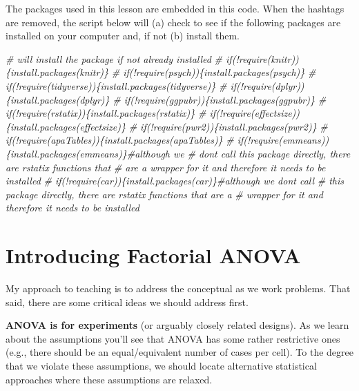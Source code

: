 \documentclass[
  11pt,
]{book}
\newenvironment{Shaded}{\begin{snugshade}}{\end{snugshade}}
\newcommand{\CommentTok}[1]{\textcolor[rgb]{0.37,0.37,0.37}{\textit{#1}}}
\begin{document}
The packages used in this lesson are embedded in this code. When the hashtags are removed, the script below will (a) check to see if the following packages are installed on your computer and, if not (b) install them.

\begin{Shaded}
\begin{Highlighting}[]
\CommentTok{\# will install the package if not already installed}
\CommentTok{\# if(!require(knitr))\{install.packages(\textquotesingle{}knitr\textquotesingle{})\}}
\CommentTok{\# if(!require(psych))\{install.packages(\textquotesingle{}psych\textquotesingle{})\}}
\CommentTok{\# if(!require(tidyverse))\{install.packages(\textquotesingle{}tidyverse\textquotesingle{})\}}
\CommentTok{\# if(!require(dplyr))\{install.packages(\textquotesingle{}dplyr\textquotesingle{})\}}
\CommentTok{\# if(!require(ggpubr))\{install.packages(\textquotesingle{}ggpubr\textquotesingle{})\}}
\CommentTok{\# if(!require(rstatix))\{install.packages(\textquotesingle{}rstatix\textquotesingle{})\}}
\CommentTok{\# if(!require(effectsize))\{install.packages(\textquotesingle{}effectsize\textquotesingle{})\}}
\CommentTok{\# if(!require(pwr2))\{install.packages(\textquotesingle{}pwr2\textquotesingle{})\}}
\CommentTok{\# if(!require(apaTables))\{install.packages(\textquotesingle{}apaTables\textquotesingle{})\}}
\CommentTok{\# if(!require(emmeans))\{install.packages(\textquotesingle{}emmeans\textquotesingle{})\}\#although we}
\CommentTok{\# don\textquotesingle{}t call this package directly, there are rstatix functions that}
\CommentTok{\# are a wrapper for it and therefore it needs to be installed}
\CommentTok{\# if(!require(car))\{install.packages(\textquotesingle{}car\textquotesingle{})\}\#although we don\textquotesingle{}t call}
\CommentTok{\# this package directly, there are rstatix functions that are a}
\CommentTok{\# wrapper for it and therefore it needs to be installed}
\end{Highlighting}
\end{Shaded}

\hypertarget{introducing-factorial-anova}{%
\section{Introducing Factorial ANOVA}\label{introducing-factorial-anova}}

My approach to teaching is to address the conceptual as we work problems. That said, there are some critical ideas we should address first.

\textbf{ANOVA is for experiments} (or arguably closely related designs). As we learn about the assumptions you'll see that ANOVA has some rather restrictive ones (e.g., there should be an equal/equivalent number of cases per cell). To the degree that we violate these assumptions, we should locate alternative statistical approaches where these assumptions are relaxed.
\end{document}
